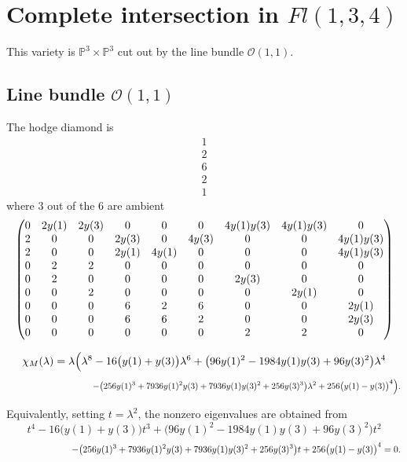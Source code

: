 \documentclass[11pt]{amsart}
\begin{document}
\section{Complete intersection in $Fl(1,3,4)$}
This variety is $\mathbb{P}^3 \times \mathbb{P}^3$ cut out by the line bundle $\mathcal{O}(1,1)$.
\subsection{Line bundle $\mathcal{O}(1,1)$}

The hodge diamond is
\[
    \begin{array}{c}
         1  \\
          2\\
          6\\
          2\\
          1
    \end{array}
\]
where $3$ out of the $6$ are ambient
\[
  \resizebox{\textwidth}{!}{$
\begin{pmatrix}
0 & 2y(1) & 2y(3) & 0 & 0 & 0 & 4y(1)y(3) & 4y(1)y(3) & 0 \\
2 & 0 & 0 & 2y(3) & 0 & 4y(3) & 0 & 0 & 4y(1)y(3) \\
2 & 0 & 0 & 2y(1) & 4y(1) & 0 & 0 & 0 & 4y(1)y(3) \\
0 & 2 & 2 & 0 & 0 & 0 & 0 & 0 & 0 \\
0 & 2 & 0 & 0 & 0 & 0 & 2y(3) & 0 & 0 \\
0 & 0 & 2 & 0 & 0 & 0 & 0 & 2y(1) & 0 \\
0 & 0 & 0 & 6 & 2 & 6 & 0 & 0 & 2y(1) \\
0 & 0 & 0 & 6 & 6 & 2 & 0 & 0 & 2y(3) \\
0 & 0 & 0 & 0 & 0 & 0 & 2 & 2 & 0
\end{pmatrix}
$}
\]



\[
\chi_M(\lambda)
=
\lambda\Bigl(
\lambda^8
-16\bigl(y(1)+y(3)\bigr)\lambda^6
+\bigl(96y(1)^2-1984y(1)y(3)+96y(3)^2\bigr)\lambda^4
\]
\[
\hspace{3.5cm}
-\bigl(256y(1)^3+7936y(1)^2y(3)+7936y(1)y(3)^2+256y(3)^3\bigr)\lambda^2
+256\bigl(y(1)-y(3)\bigr)^4
\Bigr).
\]

Equivalently, setting \(t=\lambda^2\), the nonzero eigenvalues are obtained from
\[
t^4
-16\bigl(y(1)+y(3)\bigr)t^3
+\bigl(96y(1)^2-1984y(1)y(3)+96y(3)^2\bigr)t^2
\]
\[
\hspace{2.5cm}
-\bigl(256y(1)^3+7936y(1)^2y(3)+7936y(1)y(3)^2+256y(3)^3\bigr)t
+256\bigl(y(1)-y(3)\bigr)^4=0.
\]
\end{document}
